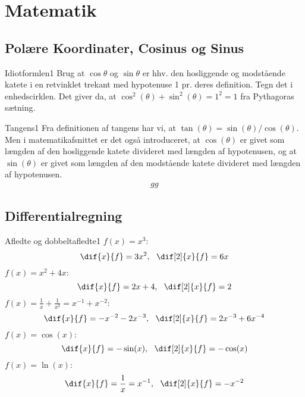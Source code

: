 \chapter{Matematik}
\section{Polære Koordinater, Cosinus og Sinus}
\begin{opgave}{Idiotformlen}{1}
Brug at $\cos \theta$ og $\sin \theta$ er hhv. den hosliggende og modstående katete i en retvinklet trekant med hypotenuse 1 pr. deres definition. Tegn det i enhedscirklen. Det giver da, at $\cos^2 (\theta) + \sin^2 (\theta) = 1^2 = 1$ fra Pythagoras sætning. 
\end{opgave}
\begin{opgave}{Tangens}{1}
Fra definitionen af tangens har vi, at $\tan(\theta) = \sin(\theta)/\cos(\theta)$. Men i matematikafsnittet er det også introduceret, at $\cos(\theta)$ er givet som længden af den hosliggende katete divideret med længden af hypotenusen, og at $\sin(\theta)$ er givet som længden af den modstående katete divideret med længden af hypotenusen. 
\begin{align*}
gg
\end{align*}
\end{opgave}
\section*{Differentialregning}
\begin{opgave}{Afledte og dobbeltafledte}{1}
\opg $f(x) = x^3$: 
\begin{equation*}
\dif{x}{f}=3x^2,~~ \dif[2]{x}{f}=6x
\end{equation*}
\opg $f(x) = x^2 + 4x$:
\begin{equation*}
\dif{x}{f}=2x+4,~~ \dif[2]{x}{f}=2
\end{equation*}
\opg $f(x) = \frac{1}{x} + \frac{1}{x^2}=x^{-1}+x^{-2}$: 
\begin{equation*}
\dif{x}{f} = - x^{-2}-2x^{-3}, ~~\dif[2]{x}{f}=2x^{-3}+6x^{-4}
\end{equation*}
\opg $f(x) = \cos (x)$: 
\begin{equation*}
\dif{x}{f}= - \sin (x),~~ \dif[2]{x}{f}=-\cos (x)
\end{equation*}
\opg $f(x) = \ln (x)$: 
\begin{equation*}
\dif{x}{f}= \frac{1}{x}=x^{-1},~~\dif[2]{x}{f}=-x^{-2}
\end{equation*}
\end{opgave}

